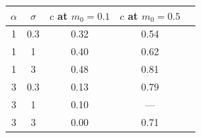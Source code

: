 \begin{tabular}{ccccc}
\toprule
$\alpha$ & $\sigma$ & $c$ at $m_0=0.1$ & $c$ at $m_0=0.5$ \\
\midrule
1 & 0.3 & 0.32 & 0.54 \\
1 & 1 & 0.40 & 0.62 \\
1 & 3 & 0.48 & 0.81 \\
3 & 0.3 & 0.13 & 0.79 \\
3 & 1 & 0.10 & --- \\
3 & 3 & 0.00 & 0.71 \\
\bottomrule
\end{tabular}
